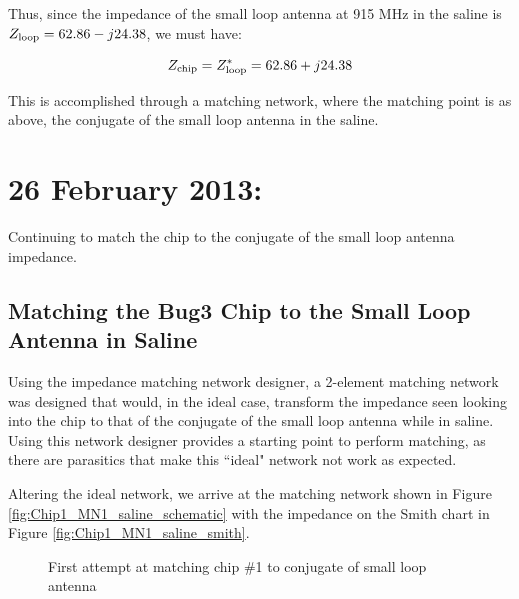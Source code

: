 \documentclass[12pt,onecolumn,titlepage]{article}
\begin{document}
Thus, since the impedance of the small loop antenna at 915 MHz in the saline is $Z_{{\rm{loop}}}=62.86-j24.38$, we must have:

\[Z_{{\rm{chip}}}=Z_{{\rm{loop}}}^{*}=62.86+j24.38 \]

This is accomplished through a matching network, where the matching point is as above, the conjugate of the small loop antenna in the saline.



\clearpage
\section{26 February 2013:}

\indent \indent Continuing to match the chip to the conjugate of the small loop antenna impedance. 

\subsection{Matching the Bug3 Chip to the Small Loop Antenna in Saline}
\indent \indent Using the impedance matching network designer, a 2-element matching network was designed that would, in the ideal case, transform the impedance seen looking into the chip to that of the conjugate of the small loop antenna while in saline. Using this network designer provides a starting point to perform matching, as there are parasitics that make this ``ideal" network not work as expected.

Altering the ideal network, we arrive at the matching network shown in Figure \ref{fig:Chip1_MN1_saline_schematic} with the impedance on the Smith chart in Figure \ref{fig:Chip1_MN1_saline_smith}.


\begin{figure}[htbp]
	\centering
		\quad
	\label{fig:Chip1_MN1_saline}
	\caption{First attempt at matching chip \#1 to conjugate of small loop antenna}
\end{figure}
\end{document}
